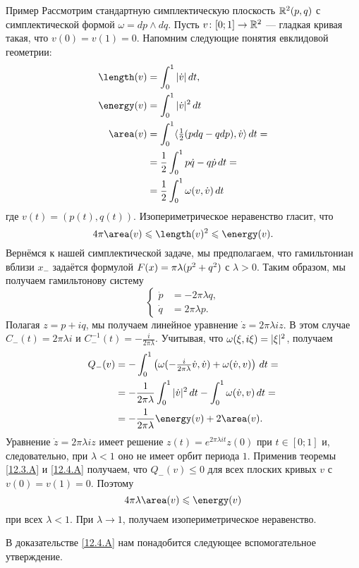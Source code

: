 \begin{ex*}{Пример}
Рассмотрим стандартную симплектическую плоскость $\mathbb{R}^2(p, q)$ с симплектической формой $\omega = dp \wedge dq$.
Пусть $v\colon [0;1] \to\mathbb{R}^2$ — гладкая кривая такая, что $v(0)=v(1)=0$.
Напомним следующие понятия евклидовой геометрии: 
\begin{align*}
\length(v)&=\int_0^1|\dot v|\,\d t,
\\
\energy(v)&=\int_0^1|\dot v|^2\,\d t
\\
\area(v)&=\int_0^1\langle \tfrac12(p\d q-q\d p),\dot v\rangle\,\d t=
\\
&=\frac12\int_0^1 p\dot q-q\dot p\,\d t=
\\
&=\frac12\int_0^1\omega(v,\dot v)\,\d t
\end{align*}
где $v(t) = (p(t), q(t))$.
Изопериметрическое неравенство гласит, что
\[4\pi\area(v)\le\length(v)^2\le \energy(v).\]
Вернёмся к нашей симплектической задаче, мы предполагаем, что гамильтониан вблизи $x_-$ задаётся формулой $F(x) = \pi \lambda(p^2 \z+ q^2)$ с $\lambda > 0$.
Таким образом, мы получаем гамильтонову систему 
\[
\begin{cases}
\dot p &= -2\pi\lambda q,
\\
\dot q &= 2\pi\lambda p.
\end{cases}
\]
Полагая $z = p + iq$, мы получаем линейное уравнение $\dot z = 2\pi \lambda iz$.
В этом случае $C_-(t) = 2\pi\lambda i$ и $C_-^{-1}(t) = -\frac i{2\pi\lambda}$.
Учитывая, что $\omega(\xi,i\xi) \z= |\xi|^2$, получаем
\begin{align*}
Q_-(v)&=-\int_0^1\left(\omega(-\tfrac i{2\pi\lambda}\dot v,\dot v)+\omega(\dot v, v)\right)\,dt=
\\
&=-\frac 1{2\pi\lambda}\int_0^1|\dot v|^2\,dt-\int_0^1\omega(\dot v,v)\,dt=
\\
&=-\frac 1{2\pi\lambda}\energy(v)+2\area(v).
\end{align*}
Уравнение $\dot z = 2\pi\lambda iz$ имеет решение $z(t) = e^{2\pi\lambda it}z(0)$ при $t \in [0;1]$ и, следовательно, при $\lambda < 1$ оно не имеет орбит периода $1$.
Применив теоремы \ref{12.3.A} и \ref{12.4.A} получаем, что $Q_-(v)\le 0$ для всех плоских кривых $v$ с $v(0) = v(1) = 0$.
Поэтому 
\[4\pi \lambda \area(v) \le \energy (v)\]
при всех $\lambda < 1$.
При $\lambda\to1$, получаем изопериметрическое неравенство.
\end{ex*}

В доказательстве \ref{12.4.A} нам понадобится следующее вспомогательное утверждение.

